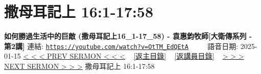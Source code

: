 \documentclass{book}
\begin{document}
\section{撒母耳記上 16:1-17:58}
\label{sec:OtTM_EdQEtA}
\textbf{如何勝過生活中的巨敵 (撒母耳記上16\_1-17\_58) - 袁惠鈞牧師[大衛傳系列 - 第2講]}
\newline
\newline
連結: \href{https://youtube.com/watch?v=OtTM_EdQEtA}{\texttt{https://youtube.com/watch?v=OtTM\_EdQEtA}} ~~~~ 語音日期: 2025-01-15
\newline
\newline
\hyperref[sec:tSKgQzYFv8g]{< < < PREV SERMON < < <}
~
\hyperlink{toc}{[返主目錄]}
~
\hyperref[ch:preacher12]{[返講員目錄]}
~
\hyperref[sec:9t69tF6ci0k]{> > > NEXT SERMON > > >}
\newline
\newline
撒母耳記上 16:1-17:58
\newline
\end{document}
